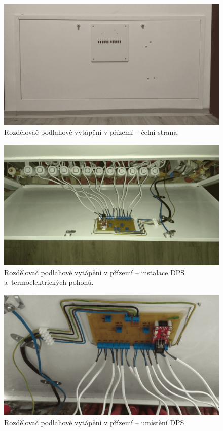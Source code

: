 \begin{figure}[H]
    \centering
    \includegraphics[width=\textwidth]{images/rozdelovac-prizemi/rozdelovac-prizemi-celni-strana.png}
    \caption{Rozdělovač podlahové vytápění v přízemí – čelní strana.}
    \label{fig:rozdelovac-prizemi-celni-strana}
\end{figure}

\begin{figure}[H]
    \centering
    \includegraphics[width=\textwidth]{images/rozdelovac-prizemi/rozdelovac-prizemi.png}
    \caption[Rozdělovač podlahové vytápění v přízemí – uvnitř]{Rozdělovač podlahové vytápění v přízemí – instalace DPS a~termoelektrických pohonů.}
    \label{fig:rozdelovac-prizemi}
\end{figure}

\begin{figure}[H]
    \centering
    \includegraphics[width=\textwidth]{images/rozdelovac-prizemi/rozdelovac-prizemi-umisteni-dps.png}
    \caption{Rozdělovač podlahové vytápění v přízemí – umístění DPS}
    \label{fig:rozdelovac-prizemi-umisteni-dps}
\end{figure}